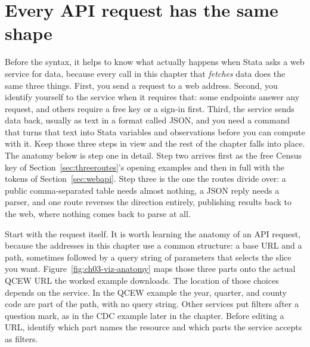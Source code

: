 \documentclass[
    a4paper,
    fontsize=10pt,
    twoside=true,
    numbers=noenddot,
]{kaobook}
\begin{document}
\section{Every API request has the same shape}\label{ch03-sc-shape}
Before the syntax, it helps to know what actually happens when Stata asks a web service for data, because every call in this chapter that \emph{fetches} data does the same three things. First, you send a request to a web address. Second, you identify yourself to the service when it requires that: some endpoints answer any request, and others require a free key or a sign-in first. Third, the service sends data back, usually as text in a format called JSON, and you need a command that turns that text into Stata variables and observations before you can compute with it. Keep those three steps in view and the rest of the chapter falls into place. The anatomy below is step one in detail. Step two arrives first as the free Census key of Section~\ref{sec:threeroutes}'s opening examples and then in full with the tokens of Section~\ref{sec:webapi}. Step three is the one the routes divide over: a public comma-separated table needs almost nothing, a JSON reply needs a parser, and one route reverses the direction entirely, publishing results back to the web, where nothing comes back to parse at all.

Start with the request itself. It is worth learning the anatomy of an API request, because the addresses in this chapter use a common structure: a base URL and a path, sometimes followed by a query string of parameters that selects the slice you want. Figure~\ref{fig:ch03-viz-anatomy} maps those three parts onto the actual QCEW URL the worked example downloads. The location of those choices depends on the service. In the QCEW example the year, quarter, and county code are part of the path, with no query string. Other services put filters after a question mark, as in the CDC example later in the chapter. Before editing a URL, identify which part names the resource and which parts the service accepts as filters.
\end{document}
